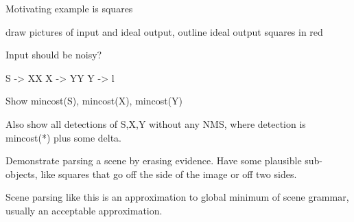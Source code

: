 

Motivating example is squares

draw pictures of input and ideal output, outline ideal output squares
in red

Input should be noisy?

S -> XX
X -> YY
Y -> l

Show mincost(S), mincost(X), mincost(Y)

Also show all detections of S,X,Y without any NMS, where detection is
mincost(*) plus some delta.

Demonstrate parsing a scene by erasing evidence. Have some plausible
sub-objects, like squares that go off the side of the image or off two
sides.

Scene parsing like this is an approximation to global minimum of scene
grammar, usually an acceptable approximation.
